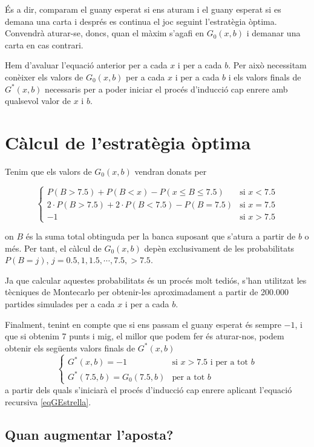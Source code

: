 \documentclass[9pt]{IEEEtran}
\begin{document}
És a dir, comparam el guany esperat si ens aturam i el guany esperat si es demana una carta i després es continua el joc seguint l'estratègia òptima. Convendrà aturar-se, doncs, quan el màxim s'agafi en $G_0(x,b)$ i demanar una carta en cas contrari.

Hem d'avaluar l'equació anterior per a cada $x$ i per a cada $b$. Per això necessitam conèixer els valors de $G_0(x,b)$ per a cada $x$ i per a cada $b$ i els valors finals de $G^*(x,b)$ necessaris per a poder iniciar el procés d'inducció cap enrere amb qualsevol valor de $x$ i $b$.

\section{Càlcul de l'estratègia òptima}

Tenim que els valors de $G_0(x,b)$ vendran donats per 
\begin{small}
$$\begin{cases}
P(B>7.5) + P(B<x) - P(x \leq B \leq 7.5) & \text{si }x < 7.5 \\
2\cdot P(B>7.5) + 2\cdot P(B<7.5) - P(B = 7.5) & \text{si }x = 7.5 \\
-1 & \text{si } x > 7.5
\end{cases}$$
\end{small}
on $B$ és la suma total obtinguda per la banca suposant que s'atura a partir de $b$ o més. Per tant, el càlcul de $G_0(x,b)$ depèn exclusivament de les probabilitats $P(B = j)$, $j = 0.5, 1 , 1.5, \cdots , 7.5, > 7.5$. 

Ja que calcular aquestes probabilitats és un procés molt tediós, s'han utilitzat les tècniques de Montecarlo per obtenir-les aproximadament a partir de 200.000 partides simulades per a cada $x$ i per a cada $b$.

Finalment, tenint en compte que si ens passam el guany esperat és sempre $-1$, i que si obtenim 7 punts i mig, el millor que podem fer és aturar-nos, podem obtenir els següents valors finals de $G^*(x,b)$ 
$$\begin{cases}
G^*(x,b)  = -1 & \text{si } x>7.5 \text{ i per a tot } b\\
G^*(7.5,b) = G_0(7.5,b) & \text{per a tot } b
\end{cases}$$
a partir dels quals s'iniciarà el procés d'inducció cap enrere aplicant l'equació recursiva \ref{eqGEstrella}.

\subsection{Quan augmentar l'aposta?}
\end{document}
